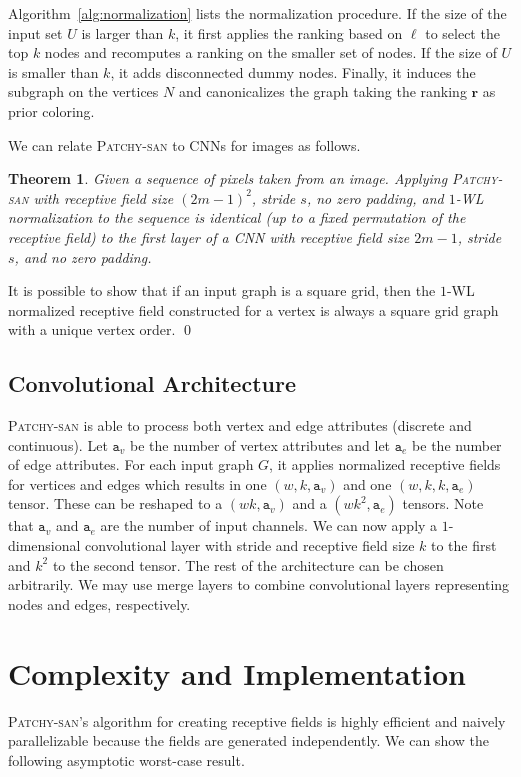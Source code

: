 \documentclass{article}
\newtheorem{thmx}{Theorem}
\renewenvironment{proof}{{\bf Proof:}}{\qed}
\newcommand{\patchysan}{{\textsc{Patchy-san}}\xspace}
\begin{document}
Algorithm~\ref{alg:normalization} lists the normalization procedure. If the size of the input set $U$ is larger than $k$, it first applies the ranking based on $\ell$ to select the top $k$ nodes and recomputes a ranking on the smaller set of nodes. If the size of $U$ is smaller than $k$, it adds disconnected dummy nodes. Finally, it induces the subgraph on the vertices $N$ and canonicalizes the graph taking the ranking $\mathbf{r}$ as prior coloring.

We can relate \textsc{Patchy-san} to CNNs for images as follows. 
\begin{thmx}
Given a sequence of pixels taken from an image. Applying \textsc{Patchy-san} with receptive field size $(2m-1)^2$, stride $s$, no zero padding, and $1$-WL normalization to the sequence is identical (up to a fixed permutation of the receptive field) to the first layer of a \textsc{CNN} with receptive field size $2m-1$, stride $s$, and no zero padding.  
\end{thmx}

\begin{proof}
It is possible to show that if an input graph is a square grid, then the $1$-WL normalized receptive field constructed for a vertex is always a square grid graph with a unique vertex order. 
\end{proof}

\subsection{Convolutional Architecture}

\patchysan is able to process both vertex and edge attributes (discrete and continuous). Let $\mathtt{a}_v$ be the number of vertex attributes and let $\mathtt{a}_e$ be the number of edge attributes. For each input graph $G$, it applies normalized receptive fields for vertices and edges which results in one $(w, k, \mathtt{a}_v)$ and one $(w, k, k, \mathtt{a}_e)$ tensor. These can be reshaped to a $(wk, \mathtt{a}_v)$ and a $(wk^2, \mathtt{a}_e)$ tensors. Note that $\mathtt{a}_v$ and $\mathtt{a}_e$ are the number of input channels. We can now apply a $1$-dimensional convolutional layer with stride and receptive field size $k$ to the first and $k^2$ to the second tensor. The rest of the architecture can be chosen arbitrarily. We may use merge layers to combine convolutional layers representing nodes and edges, respectively.


\section{Complexity and Implementation}
\patchysan's algorithm for creating receptive fields is highly efficient and  naively parallelizable because the fields are generated independently. We can show the following asymptotic worst-case result.
\end{document}
